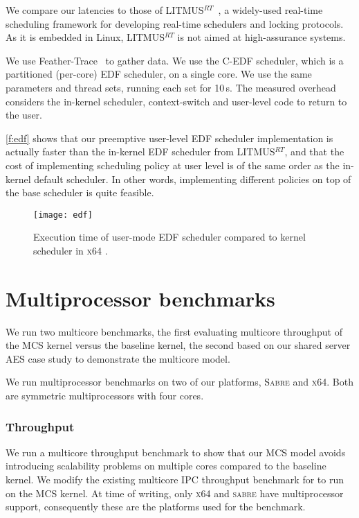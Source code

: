 We compare our latencies to those of
LITMUS$^{RT}$~\citep{Calandrino_LBDA_06}, a widely-used real-time scheduling
framework for developing real-time schedulers and locking protocols. 
As it is  embedded in Linux, LITMUS$^{RT}$ is not aimed at high-assurance systems.

We use Feather-Trace~\citep{Brandenburg_Anderson_07} to gather data.
We use the C-EDF scheduler, which is a partitioned (per-core) EDF scheduler, on a single
core. We use the same parameters and thread sets, running each set for 10\,s. 
The measured overhead considers the in-kernel scheduler, context-switch and user-level code to return to
the user.

\autoref{f:edf} shows that our preemptive user-level EDF scheduler implementation is
actually faster than the in-kernel EDF scheduler from LITMUS$^{RT}$, and
that the cost of implementing scheduling policy at user level is of
the same order as the in-kernel default scheduler. In other words,
implementing different policies on top of the base scheduler is quite feasible.

\begin{figure}[t]
    \centering
    \texttt{[image: edf]}
    \caption[Results of \selfour user-level EDF versus \litmus.]{Execution time of \selfour user-mode EDF scheduler compared to
             kernel scheduler in \textsc{x64} \litmus.}
    \label{f:edf}
\end{figure}

\section{Multiprocessor benchmarks}

We run two multicore benchmarks, the first evaluating multicore throughput of the MCS kernel versus the
baseline kernel, the second based on our shared server \gls{AES} case study to demonstrate the
multicore model. 

We run multiprocessor benchmarks on two of our platforms, \textsc{Sabre} and \textsc{x64}. Both 
are symmetric multiprocessors with four cores. 

\subsubsection{Throughput}

We run a multicore throughput benchmark to show that our MCS model
avoids introducing scalability problems on multiple cores compared to the baseline kernel.
We modify the
existing multicore IPC throughput benchmark for \selfour to run on the MCS kernel. 
At time of writing, only \textsc{x64} and \textsc{sabre} have \selfour multiprocessor support, 
consequently these are the platforms used for the benchmark.

